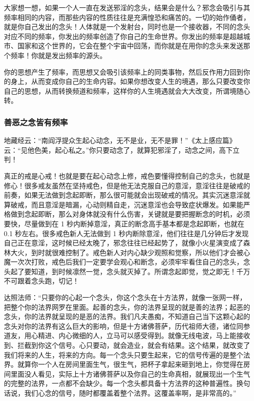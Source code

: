 \documentclass[fontset=founder]{ctexart}
\begin{document}
大家想一想，如果一个人一直在发送邪淫的念头，结果会是什么？邪念会吸引与其频率相同的内容，而那些内容的性质往往是充满惶恐和痛苦的。一切的始作俑者，就是你自己发出的念头！人体就是一个发射台，同时也是一个接收器，不同的念头对应不同的频率，你发出的频率创造了你自己的生命世界。你发出的频率是超越城市、国家和这个世界的，它会在整个宇宙中回荡，而你就是在用你的念头来发送那个频率！你就是发出频率的源头。

你的思想产生了频率，而思想又会吸引该频率上的同类事物，然后反作用力回到你的身上，从而变成你自己的生命内容。如果你想改变人生的境遇，那么只要改变你自己的思想，从而转换频道和频率，这样你的人生境遇就会大大改变，所谓境随心转。

\subsubsection{善恶之念皆有频率}

地藏经云：“南阎浮提众生起心动念，无不是业，无不是罪！”《太上感应篇》云：“见他色美，起心私之。”你只要动念了，就算犯邪淫了，动念之间，高下立判！

真正的戒是心戒！也就是要在起心动念上修，戒色要懂得控制自己的念头，也就是修心！很多戒友虽然在坚持戒色，但是他无法克服自己的意淫，意淫往往是破戒的前奏，如果无法做到念起即断，那么很可能就会出现破戒的情况。其实沉迷意淫就算破戒，而且意淫是暗漏，心动则精自走，沉迷意淫也会导致症状爆发。如果能严格做到念起即断，那么对身体就没有什么伤害，关键就是要把握断念的时机，必须要快，尽量做到在 1 秒内断掉意淫，真正的断念高手基本都是念起即断，也就在 0.1 秒左右。很多戒色新人无法做到 1 秒内断除意淫，他们往往是几分钟后才发现自己正在意淫，这时候已经太晚了，邪念往往已经起势了，就像小火星演变成了森林大火，到时就很难控制了。戒色新人对内心缺少观照和觉察，所以他们才会被心魔一次次打败，戒色后我们一定要学会观心和断念，必须牢牢看住自己的念头，念头起了要知道，到时候凛然一觉，念头就灭掉了。所谓念起即觉，觉之即无！千万不可跟着念头跑，切记！

达照法师：“只要你的心起一个念头，你这个念头在十方法界，就像一张网一样，把整个你的法界网罗在里面。起善的念头，你的法界呈现的就是善的法界；起恶的念头，你的法界就呈现的是恶的法界。我们凡夫愚痴，不知道自己当下这颗心起的念头对你的法界有这么巨大的影响，但是十方诸佛菩萨，历代祖师大德，诸位同参道友，用心精进、内心微细的人，立马可以感受得到。就像无线电波，马上能接收到、拦截到你这个信号。心只要动，就会造业，就会有结果。这个结果，就改变了我们将来的人生，将来的方向。每一个念头只要生起来，它的信号传遍的是整个法界。就算你一个人在房间里面生气，很生气，把杯子拿起来砸到地上，你觉得在房间里面没人看见，实际上十方诸佛菩萨以及你自己的生命真相，就展现出一个生气的完整的法界，一点都不会缺少。每一个念头都具备十方法界的这种普遍性。换句话说，我们心念的信号，随时都覆盖着整个法界。这覆盖率啊，是非常高的。”
\end{document}
